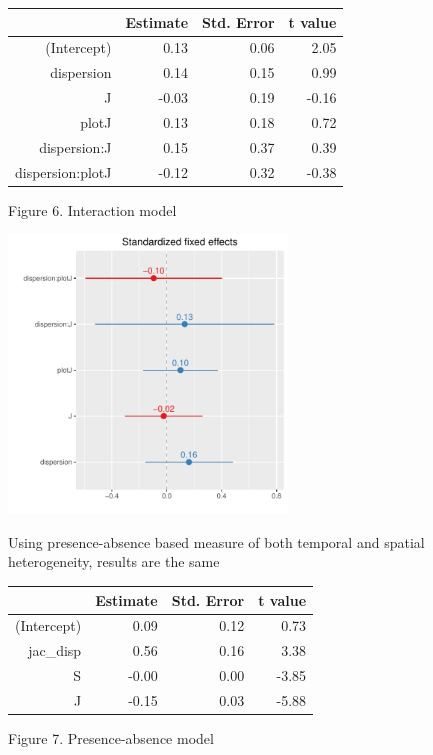 \documentclass[11pt]{article}
\begin{document}
\FloatBarrier
\begin{table}[ht]
\centering
\begin{tabular}{rrrr}
  \hline
 & Estimate & Std. Error & t value \\ 
  \hline
(Intercept) & 0.13 & 0.06 & 2.05 \\ 
  dispersion & 0.14 & 0.15 & 0.99 \\ 
  J & -0.03 & 0.19 & -0.16 \\ 
  plotJ & 0.13 & 0.18 & 0.72 \\ 
  dispersion:J & 0.15 & 0.37 & 0.39 \\ 
  dispersion:plotJ & -0.12 & 0.32 & -0.38 \\ 
   \hline
\end{tabular}
\end{table}
\FloatBarrier

Figure 6. Interaction model

\includegraphics[width=280px]{interaxplot}

Using presence-absence based measure of both temporal and spatial heterogeneity, results are the same

\FloatBarrier
\begin{table}[ht]
\centering
\begin{tabular}{rrrr}
  \hline
 & Estimate & Std. Error & t value \\ 
  \hline
(Intercept) & 0.09 & 0.12 & 0.73 \\ 
  jac\_disp & 0.56 & 0.16 & 3.38 \\ 
  S & -0.00 & 0.00 & -3.85 \\ 
  J & -0.15 & 0.03 & -5.88 \\ 
   \hline
\end{tabular}
\end{table}
\FloatBarrier

Figure 7. Presence-absence model
\end{document}
